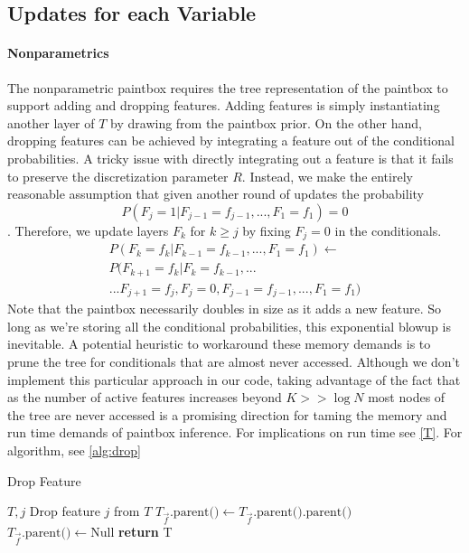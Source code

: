 \documentclass{article}
\begin{document}
\subsection{Updates for each Variable}
\paragraph{Nonparametrics} \label{nonparametrics}
The nonparametric paintbox requires the tree representation of the paintbox to support adding and dropping features.  Adding features is simply instantiating another layer of $T$ by drawing from the paintbox prior.  On the other hand, dropping features can be achieved by integrating a feature out of the conditional probabilities.  A tricky issue with directly integrating out a feature is that it fails to preserve the discretization parameter $R$.  Instead, we make the entirely reasonable assumption that given another round of updates the probability $$P(F_j = 1|F_{j-1}=f_{j-1},...,F_1=f_1) = 0$$.  Therefore, we update layers $F_k$ for $k \geq j$ by fixing $F_j = 0$ in the conditionals.   
\begin{align*}
P(F_k = f_k|F_{k-1}=f_{k-1},...,F_1=f_1) \leftarrow \\ P(F_{k+1}=f_k|F_k = f_{k-1},...\\...F_{j+1}=f_j,F_j=0, F_{j-1} = f_{j-1},...,F_1=f_1)  
\end{align*} 
Note that the paintbox necessarily doubles in size as it adds a new feature.  So long as we're storing all the conditional probabilities, this exponential blowup is inevitable.  A potential heuristic to workaround these memory demands is to prune the tree for conditionals that are almost never accessed.  Although we don't implement this particular approach in our code, taking advantage of the fact that as the number of active features increases beyond $K >> \log N$  most nodes of the tree are never accessed is a promising direction for taming the memory and run time demands of paintbox inference.  For implications on run time see \ref{T}. For algorithm, see \ref{alg:drop}

\begin{algorithm}[tb]
   \caption{Drop Feature}
   \label{alg:drop}
\begin{algorithmic}
    $T,j$ Drop feature $j$ from $T$
   \STATE $T_{\vec{f}}\text{.parent()} \leftarrow T_{\vec{f}}\text{.parent().parent()}$
   \ENDIF
   \ENDFOR
   \STATE $T_{\vec{f}}\text{.parent()} \leftarrow \text{Null}$
   \ENDFOR
   \STATE \textbf{return} T
\end{algorithmic}
\end{algorithm}
\end{document}

